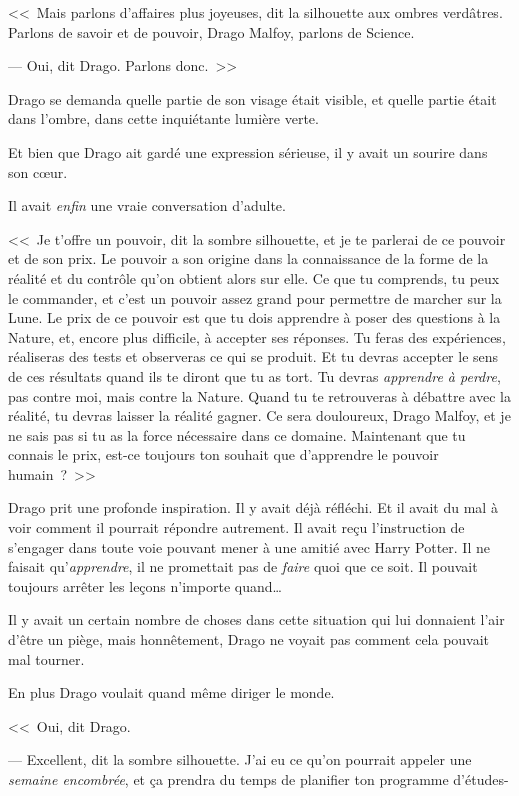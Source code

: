 <<~Mais parlons d'affaires plus joyeuses, dit la silhouette aux ombres verdâtres. Parlons de savoir et de pouvoir, Drago Malfoy, parlons de Science.

--- Oui, dit Drago. Parlons donc.~>>

Drago se demanda quelle partie de son visage était visible, et quelle partie était dans l'ombre, dans cette inquiétante lumière verte.

Et bien que Drago ait gardé une expression sérieuse, il y avait un sourire dans son cœur.

Il avait \emph{enfin} une vraie conversation d'adulte.

<<~Je t'offre un pouvoir, dit la sombre silhouette, et je te parlerai de ce pouvoir et de son prix. Le pouvoir a son origine dans la connaissance de la forme de la réalité et du contrôle qu'on obtient alors sur elle. Ce que tu comprends, tu peux le commander, et c'est un pouvoir assez grand pour permettre de marcher sur la Lune. Le prix de ce pouvoir est que tu dois apprendre à poser des questions à la Nature, et, encore plus difficile, à accepter ses réponses. Tu feras des expériences, réaliseras des tests et observeras ce qui se produit. Et tu devras accepter le sens de ces résultats quand ils te diront que tu as tort. Tu devras \emph{apprendre à perdre}, pas contre moi, mais contre la Nature. Quand tu te retrouveras à débattre avec la réalité, tu devras laisser la réalité gagner. Ce sera douloureux, Drago Malfoy, et je ne sais pas si tu as la force nécessaire dans ce domaine. Maintenant que tu connais le prix, est-ce toujours ton souhait que d'apprendre le pouvoir humain~?~>>

Drago prit une profonde inspiration. Il y avait déjà réfléchi. Et il avait du mal à voir comment il pourrait répondre autrement. Il avait reçu l'instruction de s'engager dans toute voie pouvant mener à une amitié avec Harry Potter. Il ne faisait qu'\emph{apprendre}, il ne promettait pas de \emph{faire} quoi que ce soit. Il pouvait toujours arrêter les leçons n'importe quand…

Il y avait un certain nombre de choses dans cette situation qui lui donnaient l'air d'être un piège, mais honnêtement, Drago ne voyait pas comment cela pouvait mal tourner.

En plus Drago voulait quand même diriger le monde.

<<~Oui, dit Drago.

--- Excellent, dit la sombre silhouette. J'ai eu ce qu'on pourrait appeler une \emph{semaine encombrée}, et ça prendra du temps de planifier ton programme d'études-

